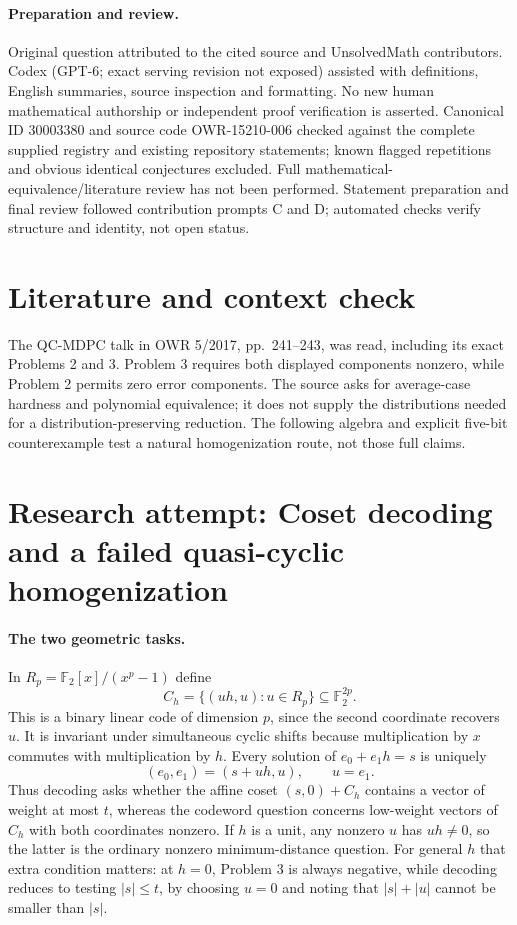 \documentclass[11pt]{article}
\begin{document}
\paragraph{Preparation and review.}
Original question attributed to the cited source and UnsolvedMath contributors. Codex (GPT-6; exact serving revision not exposed) assisted with definitions, English summaries, source inspection and formatting. No new human mathematical authorship or independent proof verification is asserted. Canonical ID 30003380 and source code OWR-15210-006 checked against the complete supplied registry and existing repository statements; known flagged repetitions and obvious identical conjectures excluded. Full mathematical-equivalence/literature review has not been performed. Statement preparation and final review followed contribution prompts C and D; automated checks verify structure and identity, not open status.
\label{end:30003380}

\section{Literature and context check}
The QC-MDPC talk in OWR 5/2017, pp.~241--243, was read, including its exact Problems 2 and 3. Problem 3 requires both displayed components nonzero, while Problem 2 permits zero error components. The source asks for average-case hardness and polynomial equivalence; it does not supply the distributions needed for a distribution-preserving reduction. The following algebra and explicit five-bit counterexample test a natural homogenization route, not those full claims.
\section{Research attempt: Coset decoding and a failed quasi-cyclic homogenization}

\paragraph{The two geometric tasks.}
In $R_p=\mathbb F_2[x]/(x^p-1)$ define
\[
 C_h=\{(uh,u):u\in R_p\}\subseteq\mathbb F_2^{2p}.
\]
This is a binary linear code of dimension $p$, since the second coordinate recovers $u$. It is invariant under simultaneous cyclic shifts because multiplication by $x$ commutes with multiplication by $h$. Every solution of $e_0+e_1h=s$ is uniquely
\[
 (e_0,e_1)=(s+uh,u),\qquad u=e_1.
\]
Thus decoding asks whether the affine coset $(s,0)+C_h$ contains a vector of weight at most $t$, whereas the codeword question concerns low-weight vectors of $C_h$ with both coordinates nonzero. If $h$ is a unit, any nonzero $u$ has $uh\ne0$, so the latter is the ordinary nonzero minimum-distance question. For general $h$ that extra condition matters: at $h=0$, Problem 3 is always negative, while decoding reduces to testing $|s|\le t$, by choosing $u=0$ and noting that $|s|+|u|$ cannot be smaller than $|s|$.
\end{document}
